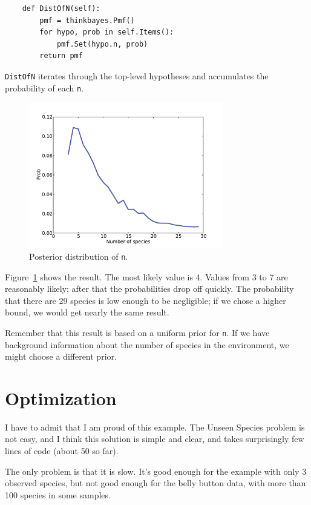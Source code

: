 \documentclass[12pt]{book}
\begin{document}
\begin{verbatim}
    def DistOfN(self):
        pmf = thinkbayes.Pmf()
        for hypo, prob in self.Items():
            pmf.Set(hypo.n, prob)
        return pmf
\end{verbatim}

{\tt DistOfN} iterates
through the top-level hypotheses and accumulates the probability
of each {\tt n}.

\begin{figure}
\centerline{\includegraphics[height=2.5in]{figs/species2.pdf}}
\caption{Posterior distribution of {\tt n}.}
\label{fig.species2}
\end{figure}

Figure~\ref{fig.species2} shows the result.  The most likely value is 4.
Values from 3 to 7 are reasonably likely; after that the probabilities
drop off quickly.  The probability that there are 29 species is
low enough to be negligible; if we chose a higher bound, 
we would get nearly the same result.

Remember that this result is based on a uniform prior for {\tt n}.  If
we have background information about the number of species in the
environment, we might choose a different prior.  


\section{Optimization}

I have to admit that I am proud of this example.  The Unseen Species
problem is not easy, and I think this solution is simple and clear,
and takes surprisingly few lines of code (about 50 so far).

The only problem is that it is slow.  It's good enough for the example
with only 3 observed species, but not good enough for the belly button
data, with more than 100 species in some samples.
\end{document}
